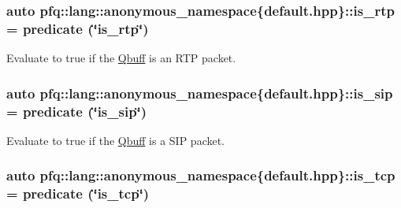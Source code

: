 \subsubsection[{\texorpdfstring{is\+\_\+rtp}{is_rtp}}]{\setlength{\rightskip}{0pt plus 5cm}auto pfq\+::lang\+::anonymous\+\_\+namespace\{default.\+hpp\}\+::is\+\_\+rtp = {\bf predicate} (\char`\"{}is\+\_\+rtp\char`\"{})}\hypertarget{namespacepfq_1_1lang_1_1anonymous__namespace_02default_8hpp_03_afef6f6217cb5e1bc0a8d1c88dbab0307}{}\label{namespacepfq_1_1lang_1_1anonymous__namespace_02default_8hpp_03_afef6f6217cb5e1bc0a8d1c88dbab0307}


Evaluate to {\ttfamily true} if the \hyperlink{structpfq_1_1lang_1_1Qbuff}{Qbuff} is an R\+TP packet. 

\subsubsection[{\texorpdfstring{is\+\_\+sip}{is_sip}}]{\setlength{\rightskip}{0pt plus 5cm}auto pfq\+::lang\+::anonymous\+\_\+namespace\{default.\+hpp\}\+::is\+\_\+sip = {\bf predicate} (\char`\"{}is\+\_\+sip\char`\"{})}\hypertarget{namespacepfq_1_1lang_1_1anonymous__namespace_02default_8hpp_03_a8be76da99d48c27e0377a7b32e1b5d7d}{}\label{namespacepfq_1_1lang_1_1anonymous__namespace_02default_8hpp_03_a8be76da99d48c27e0377a7b32e1b5d7d}


Evaluate to {\ttfamily true} if the \hyperlink{structpfq_1_1lang_1_1Qbuff}{Qbuff} is a S\+IP packet. 

\subsubsection[{\texorpdfstring{is\+\_\+tcp}{is_tcp}}]{\setlength{\rightskip}{0pt plus 5cm}auto pfq\+::lang\+::anonymous\+\_\+namespace\{default.\+hpp\}\+::is\+\_\+tcp = {\bf predicate} (\char`\"{}is\+\_\+tcp\char`\"{})}\hypertarget{namespacepfq_1_1lang_1_1anonymous__namespace_02default_8hpp_03_a67fe3072aa5353c1526aa04320d40137}{}\label{namespacepfq_1_1lang_1_1anonymous__namespace_02default_8hpp_03_a67fe3072aa5353c1526aa04320d40137}


